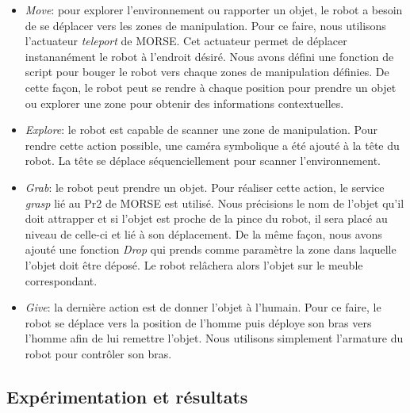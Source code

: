 \documentclass[a4paper,11pt,twoside]{StyleThese}
\begin{document}
\begin{itemize}

\item \textit{Move}: pour explorer l'environnement ou rapporter un objet, le robot a besoin de se déplacer vers les zones de manipulation. Pour ce faire, nous utilisons l'actuateur \textit{teleport} de MORSE. Cet actuateur permet de déplacer instananément le robot à l'endroit désiré. Nous avons défini une fonction de script pour bouger le robot vers chaque zones de manipulation définies. De cette façon, le robot peut se rendre à chaque position pour prendre un objet ou explorer une zone pour obtenir des informations contextuelles.

\item \textit{Explore}: le robot est capable de scanner une zone de manipulation. Pour rendre cette action possible, une caméra symbolique a été ajouté à la tête du robot. La tête se déplace séquenciellement pour scanner l'environnement.

\item \textit{Grab}: le robot peut prendre un objet. Pour réaliser cette action, le service \textit{grasp} lié au Pr2 de MORSE est utilisé. Nous précisions le nom de l'objet qu'il doit attrapper et si l'objet est proche de la pince du robot, il sera placé au niveau de celle-ci et lié à son déplacement. De la même façon, nous avons ajouté une fonction \textit{Drop} qui prends comme paramètre la zone dans laquelle l'objet doit être déposé. Le robot relâchera alors l'objet sur le meuble correspondant.

\item \textit{Give}: la dernière action est de donner l'objet à l'humain. Pour ce faire, le robot se déplace vers la position de l'homme puis déploye son bras vers l'homme afin de lui remettre l'objet. Nous utilisons simplement l'armature du robot pour contrôler son bras.
\end{itemize}



\subsection{Expérimentation et résultats}
\end{document}
